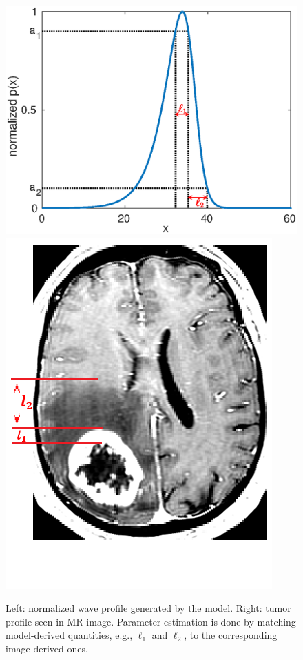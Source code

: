 \documentclass{aims}
\numberwithin{equation}{section}
\begin{document}
\begin{figure}
\begin{center}
\includegraphics[scale=0.56]{plots/waveprofile.eps}\includegraphics[scale=0.33]{plots/MR.png}
\end{center}
\caption{\label{fig:Match wid} Left: normalized wave profile generated by the model. Right: tumor profile seen in MR image. Parameter estimation is done by matching model-derived quantities, e.g., $\ell_1$ and $\ell_2$, to the corresponding image-derived ones. }

\end{figure}
\end{document}
